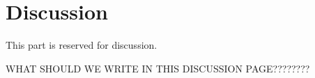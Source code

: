 \section{Discussion}
This part is reserved for discussion.


WHAT SHOULD WE WRITE IN THIS DISCUSSION PAGE????????


